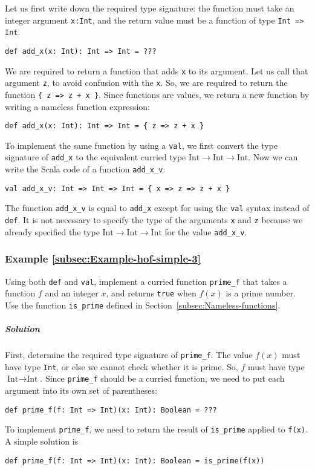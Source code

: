 Let us first write down the required type signature: the function
must take an integer argument \lstinline!x:Int!, and the return value
must be a function of type \lstinline!Int => Int!.
\begin{lstlisting}
def add_x(x: Int): Int => Int = ???
\end{lstlisting}
We are required to return a function that adds \lstinline!x! to its
argument. Let us call that argument \lstinline!z!, to avoid confusion
with the \lstinline!x!. So, we are required to return the function
\lstinline!{ z => z + x }!. Since functions are values, we return
a new function by writing a nameless function expression:
\begin{lstlisting}
def add_x(x: Int): Int => Int = { z => z + x }
\end{lstlisting}
To implement the same function by using a \lstinline!val!, we first
convert the type signature of \lstinline!add_x! to the equivalent
curried type $\text{Int}\rightarrow\text{Int}\rightarrow\text{Int}$.
Now we can write the Scala code of a function \lstinline!add_x_v!:
\begin{lstlisting}
val add_x_v: Int => Int => Int = { x => z => z + x }
\end{lstlisting}
The function \lstinline!add_x_v! is equal to \lstinline!add_x! except
for using the \lstinline!val! syntax instead of \lstinline!def!.
It is not necessary to specify the type of the arguments \lstinline!x!
and \lstinline!z! because we already specified the type $\text{Int}\rightarrow\text{Int}\rightarrow\text{Int}$
for the value \lstinline!add_x_v!. 

\subsubsection{Example \label{subsec:Example-hof-simple-3}\ref{subsec:Example-hof-simple-3}}

Using both \lstinline!def! and \lstinline!val!, implement a curried
function \lstinline!prime_f! that takes a function $f$ and an integer
$x$, and returns \lstinline!true! when $f(x)$ is a prime number.
Use the function \lstinline!is_prime! defined in Section~\ref{subsec:Nameless-functions}. 

\subparagraph{Solution}

First, determine the required type signature of \lstinline!prime_f!.
The value $f(x)$ must have type \lstinline!Int!, or else we cannot
check whether it is prime. So, $f$ must have type $\text{Int}\rightarrow\text{Int}$.
Since \lstinline!prime_f! should be a curried function, we need to
put each argument into its own set of parentheses:
\begin{lstlisting}
def prime_f(f: Int => Int)(x: Int): Boolean = ???
\end{lstlisting}
To implement \lstinline!prime_f!, we need to return the result of
\lstinline!is_prime! applied to \lstinline!f(x)!. A simple solution
is
\begin{lstlisting}
def prime_f(f: Int => Int)(x: Int): Boolean = is_prime(f(x))
\end{lstlisting}

